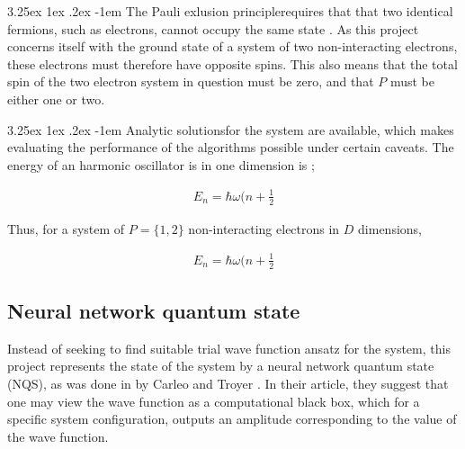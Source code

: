 \documentclass[%
oneside,                 %
final,                   %
10pt]{article}
\makeatletter
\renewcommand\paragraph{\@startsection{paragraph}{5}{\z@}%
  {3.25ex \@plus1ex \@minus.2ex}%
  {-1em}%
  {\normalfont\normalsize\bfseries}}
\makeatother
\begin{document}
\paragraph{The Pauli exlusion principle}requires that that two identical fermions, such as electrons, cannot occupy the same state \citep{Griffiths95}. As this project concerns itself with the ground state of a system of two non-interacting electrons, these electrons must therefore have opposite spins. This also means that the total spin of the two electron system in question must be zero, and that $P$ must be either one or two.

\paragraph{Analytic solutions}for the system are available, which makes evaluating the performance of the algorithms possible under certain caveats.  The energy of an harmonic oscillator is in one dimension is \citep{Griffiths95};

\begin{equation}
\begin{aligned}
E_n = \hbar \omega (n+\frac{1}{2}
\end{aligned}
\label{eq:TWF}
\end{equation}

Thus, for a system of $P=\{1,2\}$ non-interacting electrons in $D$ dimensions,

\begin{equation}
\begin{aligned}
E_n = \hbar \omega (n+\frac{1}{2}
\end{aligned}
\label{eq:TWF}
\end{equation}



\subsection{Neural network quantum state}
Instead of seeking to find suitable trial wave function ansatz for the system, this project represents the state of the system by a neural network quantum state (NQS), as was done in by Carleo and Troyer \citep{CarleoGiuseppe2017Stqm}. In their article, they suggest that one may view the wave function as a computational black box, which for a specific system configuration, outputs an amplitude corresponding to the value of the wave function. 
\end{document}
